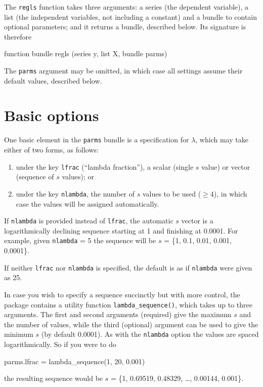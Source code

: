 \documentclass{article}
\begin{document}
The \texttt{regls} function takes three arguments: a series (the
dependent variable), a list (the independent variables, not including
a constant) and a bundle to contain optional parameters; and it
returns a bundle, described below. Its signature is therefore
\begin{code}
function bundle regls (series y, list X, bundle parms)
\end{code}

The \texttt{parms} argument may be omitted, in which case all settings
assume their default values, described below.

\section{Basic options}
\label{sec:basic-opts}

One basic element in the \texttt{parms} bundle is a specification for
$\lambda$, which may take either of two forms, as follows:
\begin{enumerate}
\item under the key \texttt{lfrac} (``lambda fraction''), a scalar
  (single $s$ value) or vector (sequence of $s$ values); or
\item under the key \texttt{nlambda}, the number of $s$ values to be
  used ($\geq 4$), in which case the values will be assigned
  automatically.
\end{enumerate}
If \texttt{nlambda} is provided instead of \texttt{lfrac}, the
automatic $s$ vector is a logarithmically declining sequence starting
at 1 and finishing at 0.0001. For example, given \texttt{nlambda} = 5
the sequence will be $s$ = \{1, 0.1, 0.01, 0.001, 0.0001\}.

If neither \texttt{lfrac} nor \texttt{nlambda} is specified, the
default is as if \texttt{nlambda} were given as 25.

In case you wish to specify a sequence succinctly but with more
control, the package contains a utility function
\texttt{lambda\_sequence()}, which takes up to three arguments. The
first and second arguments (required) give the maximum $s$ and the
number of values, while the third (optional) argument can be used to
give the minimum $s$ (by default 0.0001). As with the \texttt{nlambda}
option the values are spaced logarithmically.  So if you were to do
\begin{code}
parms.lfrac = lambda_sequence(1, 20, 0.001)
\end{code}
the resulting sequence would be $s$ = \{1, 0.69519, 0.48329, \dots,
0.00144, 0.001\}.
\end{document}
